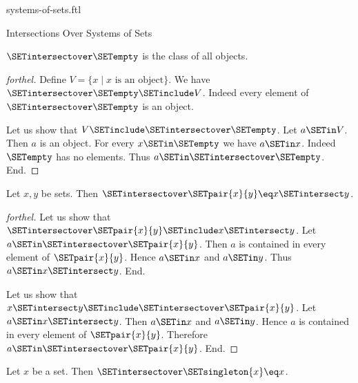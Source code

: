 \documentclass{stex}
\begin{document}
\begin{smodule}{systems-of-sets.ftl}
\begin{sfragment}{Intersections Over Systems of Sets}
  \begin{proposition}[forthel,id=FOUNDATIONS_10_2809770322952192]
    $\SETintersectover \SETempty$ is the class of all objects.
  \end{proposition}
  \begin{proof}[forthel]
    Define $V = \{ x \mid x\text{ is an object}\}$.
    We have $\SETintersectover \SETempty \SETinclude V$.
    Indeed every element of $\SETintersectover \SETempty$ is an object.

    Let us show that $V \SETinclude \SETintersectover \SETempty$.
      Let $a \SETin V$.
      Then $a$ is an object.
      For every $x \SETin \SETempty$ we have $a \SETin x$.
      Indeed $\SETempty$ has no elements.
      Thus $a \SETin \SETintersectover \SETempty$.
    End.
  \end{proof}

  \begin{proposition}[forthel,id=FOUNDATIONS_10_7851827447988224]
    Let $x, y$ be sets.
    Then $\SETintersectover \SETpair{x}{y} \eq x \SETintersect y$.
  \end{proposition}
  \begin{proof}[forthel]
    Let us show that $\SETintersectover \SETpair{x}{y} \SETinclude x \SETintersect y$.
      Let $a \SETin \SETintersectover \SETpair{x}{y}$.
      Then $a$ is contained in every element of $\SETpair{x}{y}$.
      Hence $a \SETin x$ and $a \SETin y$.
      Thus $a \SETin x \SETintersect y$.
    End.

    Let us show that $x \SETintersect y \SETinclude \SETintersectover \SETpair{x}{y}$.
      Let $a \SETin x \SETintersect y$.
      Then $a \SETin x$ and $a \SETin y$.
      Hence $a$ is contained in every element of $\SETpair{x}{y}$.
      Therefore $a \SETin \SETintersectover \SETpair{x}{y}$.
    End.
  \end{proof}

  \begin{corollary}[forthel,id=FOUNDATIONS_10_7239895674257408]
    Let $x$ be a set.
    Then $\SETintersectover \SETsingleton{x} \eq x$.
  \end{corollary}
\end{sfragment}
\end{smodule}
\end{document}
